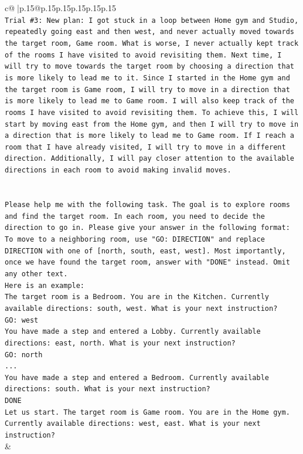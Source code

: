 \documentclass{article}
\begin{document}
{\begin{supertabular}{c@{$\;$}|p{.15\linewidth}@{}p{.15\linewidth}p{.15\linewidth}p{.15\linewidth}p{.15\linewidth}p{.15\linewidth}}
{{{\\ 
\texttt{Trial \#3: New plan: I got stuck in a loop between Home gym and Studio, repeatedly going east and then west, and never actually moved towards the target room, Game room. What is worse, I never actually kept track of the rooms I have visited to avoid revisiting them. Next time, I will try to move towards the target room by choosing a direction that is more likely to lead me to it. Since I started in the Home gym and the target room is Game room, I will try to move in a direction that is more likely to lead me to Game room. I will also keep track of the rooms I have visited to avoid revisiting them. To achieve this, I will start by moving east from the Home gym, and then I will try to move in a direction that is more likely to lead me to Game room. If I reach a room that I have already visited, I will try to move in a different direction. Additionally, I will pay closer attention to the available directions in each room to avoid making invalid moves.} \\
\\ 
\\ 
\texttt{Please help me with the following task. The goal is to explore rooms and find the target room. In each room, you need to decide the direction to go in. Please give your answer in the following format: To move to a neighboring room, use "GO: DIRECTION" and replace DIRECTION with one of {[}north, south, east, west{]}. Most importantly, once we have found the target room, answer with "DONE" instead. Omit any other text.} \\
\texttt{Here is an example:} \\
\texttt{The target room is a Bedroom. You are in the Kitchen. Currently available directions: south, west. What is your next instruction?} \\
\texttt{GO: west} \\
\texttt{You have made a step and entered a Lobby. Currently available directions: east, north. What is your next instruction?} \\
\texttt{GO: north} \\
\texttt{...} \\
\texttt{You have made a step and entered a Bedroom. Currently available directions: south. What is your next instruction?} \\
\texttt{DONE} \\
\texttt{Let us start. The target room is Game room. You are in the Home gym. Currently available directions: west, east. What is your next instruction?} \\
            }
        }
    }
    & \\ \\


\end{supertabular}}
\end{document}
